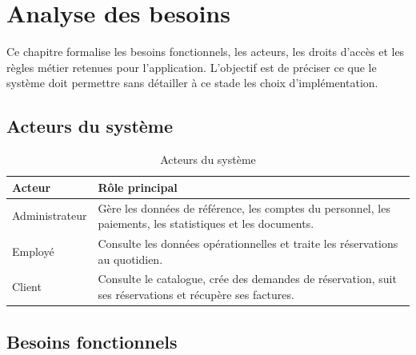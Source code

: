 \chapter{Analyse des besoins}

Ce chapitre formalise les besoins fonctionnels, les acteurs, les droits d'accès et les règles métier retenues pour l'application. L'objectif est de préciser ce que le système doit permettre sans détailler à ce stade les choix d'implémentation.

\section{Acteurs du système}

\begin{table}[H]
\centering
\caption{Acteurs du système}
\begin{tabularx}{\textwidth}{|l|X|}
\hline
\textbf{Acteur} & \textbf{Rôle principal} \\
\hline
Administrateur & Gère les données de référence, les comptes du personnel, les paiements, les statistiques et les documents. \\
\hline
Employé & Consulte les données opérationnelles et traite les réservations au quotidien. \\
\hline
Client & Consulte le catalogue, crée des demandes de réservation, suit ses réservations et récupère ses factures. \\
\hline
\end{tabularx}
\end{table}

\section{Besoins fonctionnels}

